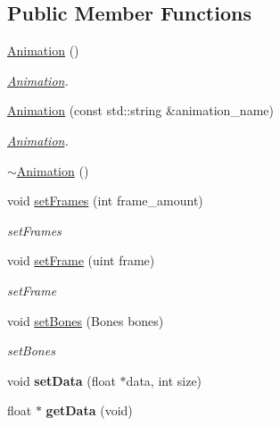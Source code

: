 \subsection*{Public Member Functions}
\begin{DoxyCompactItemize}
\item 
\hyperlink{classEngine_1_1Animation_a83f0a16cef7117f187ad596de38dd9d6}{Animation} ()
\begin{DoxyCompactList}\small\item\em \hyperlink{classEngine_1_1Animation}{Animation}. \end{DoxyCompactList}\item 
\hyperlink{classEngine_1_1Animation_a9c3ef01682e55cb773bedbad9020a759}{Animation} (const std\+::string \&animation\+\_\+name)
\begin{DoxyCompactList}\small\item\em \hyperlink{classEngine_1_1Animation}{Animation}. \end{DoxyCompactList}\item 
\hyperlink{classEngine_1_1Animation_a6462a15fd5a0d0c63ec829727d7c5c40}{$\sim$\+Animation} ()
\item 
void \hyperlink{classEngine_1_1Animation_a243fa7f2a9368bb2cdd22bbeff644ae5}{set\+Frames} (int frame\+\_\+amount)
\begin{DoxyCompactList}\small\item\em set\+Frames \end{DoxyCompactList}\item 
void \hyperlink{classEngine_1_1Animation_aa18bb6bbd6c91370795c45fb63c2a00d}{set\+Frame} (uint frame)
\begin{DoxyCompactList}\small\item\em set\+Frame \end{DoxyCompactList}\item 
void \hyperlink{classEngine_1_1Animation_a572210cbdff12025c70cd928a4aee407}{set\+Bones} (Bones bones)
\begin{DoxyCompactList}\small\item\em set\+Bones \end{DoxyCompactList}\item 
\hypertarget{classEngine_1_1Animation_ab291416fd8a47edcb2e6e34521b2a939}{}void {\bfseries set\+Data} (float $\ast$data, int size)\label{classEngine_1_1Animation_ab291416fd8a47edcb2e6e34521b2a939}

\item 
\hypertarget{classEngine_1_1Animation_a54a61c2c566a014acd9604e770bc81df}{}float $\ast$ {\bfseries get\+Data} (void)\label{classEngine_1_1Animation_a54a61c2c566a014acd9604e770bc81df}


\end{DoxyCompactItemize}
